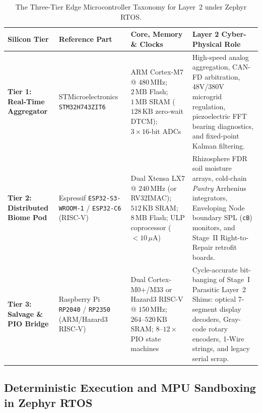 \begin{table}[htbp]
\centering
\caption{The Three-Tier Edge Microcontroller Taxonomy for Layer~2 under Zephyr RTOS.}
\label{tab:l2-mcu-taxonomy}
\footnotesize
\begin{tabular}{@{}p{2.3cm}p{2.8cm}p{3.4cm}p{5.2cm}@{}}
\toprule
\textbf{Silicon Tier} & \textbf{Reference Part} & \textbf{Core, Memory \& Clocks} & \textbf{Layer 2 Cyber-Physical Role} \\
\midrule
\textbf{Tier 1: Real-Time Aggregator} & STMicroelectronics \texttt{STM32H743ZIT6} \parencite{st_stm32h743} & ARM Cortex-M7 @ $480\,\mathrm{MHz}$; $2\,\mathrm{MB}$ Flash; $1\,\mathrm{MB}$ SRAM ($128\,\mathrm{KB}$ zero-wait DTCM); $3 \times 16\text{-bit}$ ADCs & High-speed analog aggregation, CAN-FD arbitration, 48V/380V microgrid regulation, piezoelectric FFT bearing diagnostics, and fixed-point Kalman filtering. \\
\addlinespace[3pt]
\textbf{Tier 2: Distributed Biome Pod} & Espressif \texttt{ESP32-S3-WROOM-1} / \texttt{ESP32-C6} (RISC-V) & Dual Xtensa LX7 @ $240\,\mathrm{MHz}$ (or RV32IMAC); $512\,\mathrm{KB}$ SRAM; $8\,\mathrm{MB}$ Flash; ULP coprocessor ($< 10\,\mu\mathrm{A}$) & Rhizosphere FDR soil moisture arrays, cold-chain \textit{Pantry} Arrhenius integrators, Enveloping Node boundary SPL (\texttt{cB}) monitors, and Stage~II Right-to-Repair retrofit boards. \\
\addlinespace[3pt]
\textbf{Tier 3: Salvage \& PIO Bridge} & Raspberry Pi \texttt{RP2040} / \texttt{RP2350} (ARM/Hazard3 RISC-V) & Dual Cortex-M0+/M33 or Hazard3 RISC-V @ $150\,\mathrm{MHz}$; $264\text{--}520\,\mathrm{KB}$ SRAM; $8\text{--}12\times$ PIO state machines & Cycle-accurate bit-banging of Stage~I Parasitic Layer~2 Shims: optical 7-segment display decoders, Gray-code rotary encoders, 1-Wire strings, and legacy serial scrap. \\
\bottomrule
\end{tabular}
\end{table}

\subsection{Deterministic Execution and MPU Sandboxing in Zephyr RTOS}

